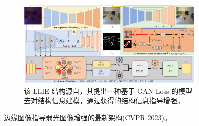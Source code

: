 \documentclass[a4paper]{ctexart}
\begin{document}
	\begin{figure}[htb]
		\centering 
		\begin{subfigure}{0.8\columnwidth}
			\includegraphics[width=\columnwidth]{picture/LLIE/Structure Modeling and Guidance/Overview}
			\captionsetup{font=scriptsize}
			\caption{该 LLIE 结构源自\cite{xu2023low}，其提出一种基于 GAN Loss 的模型去对结构信息建模，通过获得的结构信息指导增强。}
			\label{fig: SMG-LLIE Architecture}
		\end{subfigure}
		\caption{
			\label{fig: SMG-LLIE Overview} 
			边缘图像指导弱光图像增强的最新架构(CVPR 2023)。
		}
	\end{figure}
	
\end{document}
